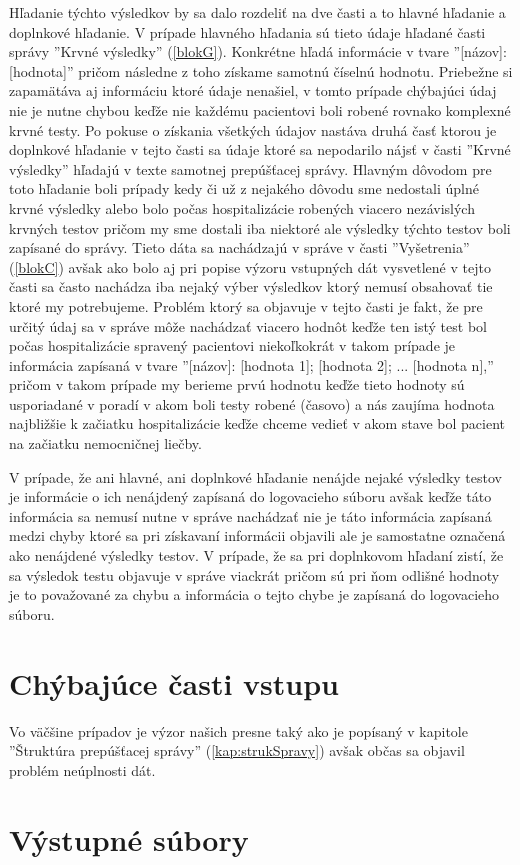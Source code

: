 Hľadanie týchto výsledkov by sa dalo rozdeliť na dve časti a to hlavné hľadanie a doplnkové hľadanie. V prípade hlavného hľadania sú tieto údaje hľadané časti správy ''Krvné výsledky'' (\ref{blokG}). Konkrétne hľadá informácie v tvare ''[názov]: [hodnota]'' pričom následne z toho získame samotnú číselnú hodnotu. Priebežne si zapamätáva aj informáciu ktoré údaje nenašiel, v tomto prípade chýbajúci údaj nie je nutne chybou keďže nie každému pacientovi boli robené rovnako komplexné krvné testy. Po pokuse o získania všetkých údajov nastáva druhá časť ktorou je doplnkové hľadanie v tejto časti sa údaje ktoré sa nepodarilo nájsť v časti ''Krvné výsledky'' hľadajú v texte samotnej prepúšťacej správy. Hlavným dôvodom pre toto hľadanie boli prípady kedy či už z nejakého dôvodu sme nedostali úplné krvné výsledky alebo bolo počas hospitalizácie robených viacero nezávislých krvných testov pričom my sme dostali iba niektoré ale výsledky týchto testov boli zapísané do správy. Tieto dáta sa nachádzajú v správe v časti ''Vyšetrenia'' (\ref{blokC}) avšak ako bolo aj pri popise výzoru vstupných dát vysvetlené v tejto časti sa často nachádza iba nejaký výber výsledkov ktorý nemusí obsahovať tie ktoré my potrebujeme. Problém ktorý sa objavuje v tejto časti je fakt, že pre určitý údaj sa v správe môže nachádzať viacero hodnôt keďže ten istý test bol počas hospitalizácie spravený pacientovi niekoľkokrát v takom prípade je informácia zapísaná v tvare ''[názov]: [hodnota 1]; [hodnota 2]; ... [hodnota n],'' pričom v takom prípade my berieme prvú hodnotu keďže tieto hodnoty sú usporiadané v poradí v akom boli testy robené (časovo) a nás zaujíma hodnota najbližšie k začiatku hospitalizácie keďže chceme vedieť v akom stave bol pacient na začiatku nemocničnej liečby.

V prípade, že ani hlavné, ani doplnkové hľadanie nenájde nejaké výsledky testov je informácie o ich nenájdený zapísaná do logovacieho súboru avšak keďže táto informácia sa nemusí nutne v správe nachádzať nie je táto informácia zapísaná medzi chyby ktoré sa pri získavaní informácii objavili ale je samostatne označená ako nenájdené výsledky testov. V prípade, že sa pri doplnkovom hľadaní zistí, že sa výsledok testu objavuje v správe viackrát pričom sú pri ňom odlišné hodnoty je to považované za chybu a informácia o tejto chybe je zapísaná do logovacieho súboru.


\section{Chýbajúce časti vstupu}

Vo väčšine prípadov je výzor našich presne taký ako je popísaný v kapitole ''Štruktúra prepúšťacej správy'' (\ref{kap:strukSpravy}) avšak občas sa objavil problém neúplnosti dát.

\section{Výstupné súbory}   

    
